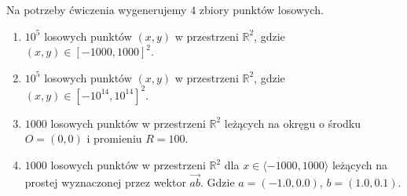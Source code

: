 \quad Na potrzeby ćwiczenia wygenerujemy $4$ zbiory punktów losowych.
\begin{enumerate}
    \item $10^5$ losowych punktów $(x, y)$ w przestrzeni $\mathbb{R}^2$, gdzie $(x, y) \in \left[-1000,1000\right]^{2}$.
    \item $10^5$ losowych punktów $(x, y)$ w przestrzeni $\mathbb{R}^2$, gdzie $(x, y) \in \left[-10^{14},10^{14}\right]^{2}$.
    \item $1000$ losowych punktów w przestrzeni $\mathbb{R}^2$ leżących na okręgu o środku $ O = (0,0)$ i promieniu $ R = 100$.
    \item $ 1000$ losowych punktów w przestrzeni $\mathbb{R}^2$ dla $ x \in \langle -1000,1000 \rangle$ leżących na prostej wyznaczonej przez wektor $ \overrightarrow{ab}$.   
    Gdzie $ a = (-1.0, 0.0)$, $ b = (1.0, 0.1)$.
\end{enumerate}

